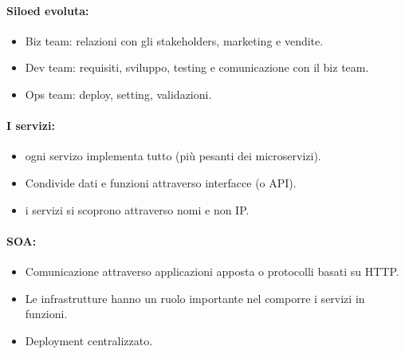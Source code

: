 \paragraph{Siloed evoluta:}

\begin{itemize}
  \item Biz team: relazioni con gli stakeholders, marketing e vendite. 
  \item Dev team: requisiti, sviluppo, testing e comunicazione con il biz team. 
  \item Ops team: deploy, setting, validazioni.
\end{itemize}





\paragraph{I servizi:}

\begin{itemize}
  \item {} ogni servizo implementa tutto (più pesanti dei microservizi). 
  \item Condivide dati e funzioni attraverso interfacce (o API). 
  \item {} i servizi si scoprono attraverso nomi e non IP.
\end{itemize}

\paragraph{SOA:}

\begin{itemize}
  \item Comunicazione attraverso applicazioni apposta o protocolli basati su HTTP. 
  \item Le infrastrutture hanno un ruolo importante nel comporre i servizi in funzioni. 
  \item Deployment centralizzato.
\end{itemize}

